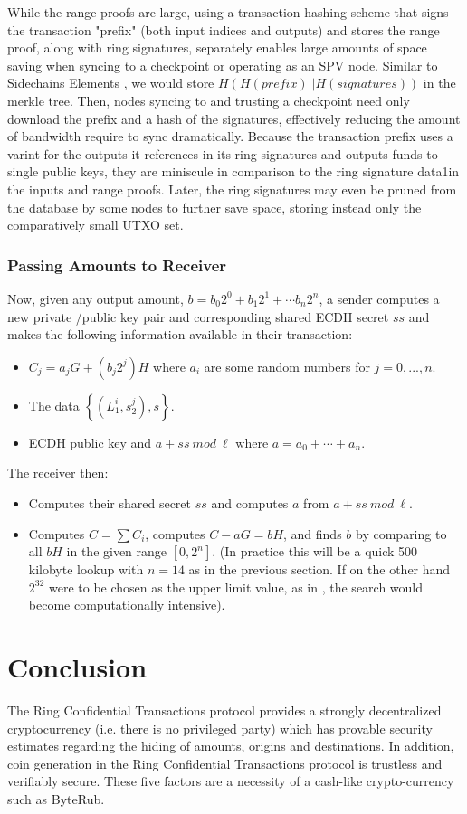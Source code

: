 \documentclass[12pt,english]{mrl}
\theoremstyle{definition}
\numberwithin{equation}{section}
\numberwithin{figure}{section}
\numberwithin{equation}{section}
\numberwithin{equation}{section}
\numberwithin{figure}{section}
\begin{document}
While the range proofs are large, using a transaction hashing scheme that signs the transaction "prefix" (both input indices and outputs) and stores the range proof, along with ring signatures, separately enables large amounts of space saving when syncing to a checkpoint or operating as an SPV node. Similar to Sidechains Elements \cite{El}, we would store 
$H(H(prefix) || H(signatures))$ in the merkle tree. Then, nodes syncing to and trusting a checkpoint need only download the prefix and a hash of the signatures, effectively reducing the amount of bandwidth require to sync dramatically. Because the transaction prefix uses a varint for the outputs it references in its ring signatures and outputs funds to single public keys, they are miniscule in comparison to the ring signature data1in the inputs and range proofs. Later, the ring signatures may even be pruned from the database by some nodes to further save space, storing instead only the comparatively small UTXO set.
\subsubsection{Passing Amounts to Receiver}
Now, given any output amount, $b = b_0 2^0 + b_1 2^1 + \cdots b_n 2^n $, a sender computes a new private /public key pair and corresponding shared ECDH secret $ss$ and makes the following information available in their transaction:
\begin{itemize}
 \item $C_j = a_j G + (b_j 2^j) H$ where $a_i$ are some random numbers for $j=0,...,n$.
 \item The data $\left\{(L_1^i, s_2^j),s\right\}$. 
 \item ECDH public key and $a + ss\ mod\ \ell$ where $a = a_0 + \cdots + a_n$. 
\end{itemize}
The receiver then:
\begin{itemize}
 \item Computes their shared secret $ss$ and computes $a$ from $a + ss\ mod\ \ell$. 
 \item Computes $C = \sum C_i$, computes $C - aG = bH$, and finds $b$ by comparing to all $bH$ in the given range $[0, 2^n]$. (In practice this will be a quick 500 kilobyte lookup with $n = 14$ as in the previous section. If on the other hand $2^{32}$ were to be chosen as the upper limit value, as in \cite{GM}, the search would become computationally intensive). 
\end{itemize}


\section{Conclusion}
The Ring Confidential Transactions protocol provides a strongly decentralized cryptocurrency (i.e. there is no privileged party) which has provable security estimates regarding the hiding of amounts, origins and destinations. In addition, coin generation in the Ring Confidential Transactions protocol is trustless and verifiably secure. These five factors are a necessity of a cash-like crypto-currency such as ByteRub. 
\end{document}
